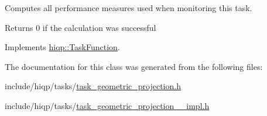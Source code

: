 Computes all performance measures used when monitoring this task. 

\begin{DoxyReturn}{Returns}
0 if the calculation was successful 
\end{DoxyReturn}


Implements \hyperlink{classhiqp_1_1TaskFunction_a47a3283a0c0ebafa17feeca96afe5af0}{hiqp\-::\-Task\-Function}.



The documentation for this class was generated from the following files\-:\begin{DoxyCompactItemize}
\item 
include/hiqp/tasks/\hyperlink{task__geometric__projection_8h}{task\-\_\-geometric\-\_\-projection.\-h}\item 
include/hiqp/tasks/\hyperlink{task__geometric__projection____impl_8h}{task\-\_\-geometric\-\_\-projection\-\_\-\-\_\-impl.\-h}\end{DoxyCompactItemize}
